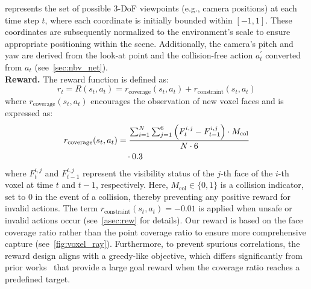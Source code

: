 represents the set of possible 3-DoF viewpoints (e.g., camera positions) at each time step $t$, where each coordinate is initially bounded within $[-1, 1]$. 
These coordinates are subsequently normalized to the environment’s scale to ensure appropriate positioning within the scene.
Additionally, the camera’s pitch and yaw are derived from the look-at point and the collision-free action $a^{'}_{t}$ converted from $a_t$ (see~\cref{sec:nbv_net}). %
\\
\textbf{Reward. }
The reward function is defined as:  %
\begin{equation}
r_t = R(s_t, a_t) = r_{\text{coverage}}(s_t, a_t) + r_{\text{constraint}}(s_t, a_t)
\end{equation}
where $r_{\text{coverage}}(s_t, a_t)$ encourages the observation of new voxel faces and is expressed as:  
\begin{align}
r_{\text{coverage}}(s_t, a_t) 
&= \frac{\sum_{i=1}^N \sum_{j=1}^6 \left( F_t^{i,j} - F_{t-1}^{i,j} \right) \cdot M_{\text{col}}}{N \cdot 6} \notag \\
&\quad \cdot 0.3
\end{align}
where $F_t^{i,j}$ and $F_{t-1}^{i,j}$ represent the visibility status of the $j$-th face of the $i$-th voxel at time $t$ and $t-1$, respectively. Here, $M_{\text{col}} \in \{0, 1\}$ is a collision indicator, set to $0$ in the event of a collision, thereby preventing any positive reward for invalid actions.
The term $r_{\text{constraint}}(s_t, a_t) = -0.01$ is applied when unsafe or invalid actions occur (see~\cref{asec:rew} for details).
Our reward is based on the face coverage ratio rather than the point coverage ratio to ensure more comprehensive capture (see~\cref{fig:voxel_ray}).  
Furthermore, to prevent spurious correlations, the reward design aligns with a greedy-like objective, which differs significantly from prior works~\cite{chen2024gennbv, peralta2020next} that provide a large goal reward when the coverage ratio reaches a predefined target.

